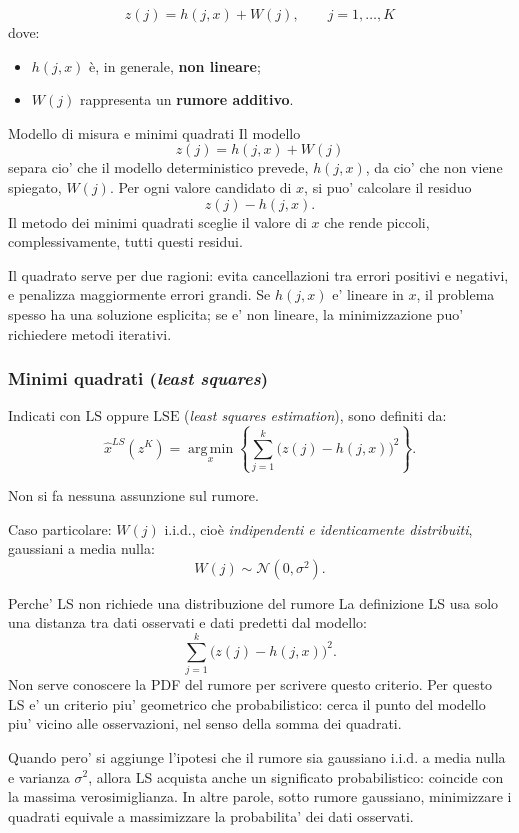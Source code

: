 \documentclass[11pt,a4paper]{article}
\begin{document}
\[
z(j)=h(j,x)+W(j),
\qquad j=1,\dots,K
\]
dove:
\begin{itemize}
    \item \(h(j,x)\) è, in generale, \textbf{non lineare};
    \item \(W(j)\) rappresenta un \textbf{rumore additivo}.
\end{itemize}

\begin{spiegazione}{Modello di misura e minimi quadrati}
Il modello
\[
z(j)=h(j,x)+W(j)
\]
separa cio' che il modello deterministico prevede, $h(j,x)$, da cio' che non viene spiegato, $W(j)$. Per ogni valore candidato di $x$, si puo' calcolare il residuo
\[
z(j)-h(j,x).
\]
Il metodo dei minimi quadrati sceglie il valore di $x$ che rende piccoli, complessivamente, tutti questi residui.

Il quadrato serve per due ragioni: evita cancellazioni tra errori positivi e negativi, e penalizza maggiormente errori grandi. Se $h(j,x)$ e' lineare in $x$, il problema spesso ha una soluzione esplicita; se e' non lineare, la minimizzazione puo' richiedere metodi iterativi.
\end{spiegazione}

\subsubsection*{Minimi quadrati (\emph{least squares})}

Indicati con \(\mathrm{LS}\) oppure \(\mathrm{LSE}\) (\emph{least squares estimation}), sono definiti da:
\[
\hat{x}^{LS}(z^K)
=
\operatorname*{arg\,min}_{x}
\left\{
\sum_{j=1}^{k}\bigl(z(j)-h(j,x)\bigr)^2
\right\}.
\]

Non si fa nessuna assunzione sul rumore.

\vspace{1em}

\noindent
Caso particolare: \(W(j)\) i.i.d., cioè \emph{indipendenti e identicamente distribuiti}, gaussiani a media nulla:
\[
W(j)\sim \mathcal{N}(0,\sigma^2).
\]

\begin{spiegazione}{Perche' LS non richiede una distribuzione del rumore}
La definizione LS usa solo una distanza tra dati osservati e dati predetti dal modello:
\[
\sum_{j=1}^{k}\bigl(z(j)-h(j,x)\bigr)^2.
\]
Non serve conoscere la PDF del rumore per scrivere questo criterio. Per questo LS e' un criterio piu' geometrico che probabilistico: cerca il punto del modello piu' vicino alle osservazioni, nel senso della somma dei quadrati.

Quando pero' si aggiunge l'ipotesi che il rumore sia gaussiano i.i.d. a media nulla e varianza $\sigma^2$, allora LS acquista anche un significato probabilistico: coincide con la massima verosimiglianza. In altre parole, sotto rumore gaussiano, minimizzare i quadrati equivale a massimizzare la probabilita' dei dati osservati.
\end{spiegazione}
\end{document}
